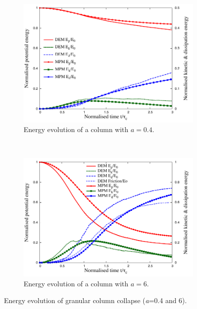 \begin{figure}[tbhp]
\centering
\begin{subfigure}[b]{0.975\textwidth}
\includegraphics[width=\textwidth]{a04_energy}
\caption{Energy evolution of a column with $a=0.4$.}
\label{fig:a04_energy}
\end{subfigure}
\\
\begin{subfigure}[b]{0.975\textwidth}
\centering
\includegraphics[width=\textwidth]{a6_energy}
\caption{Energy evolution of a column with $a=6$.}
\label{fig:a6_energy}
\end{subfigure}
\caption{Energy evolution of granular column collapse (\textit{a}=0.4 and 6).}
\label{fig:column_energy}
\end{figure}

